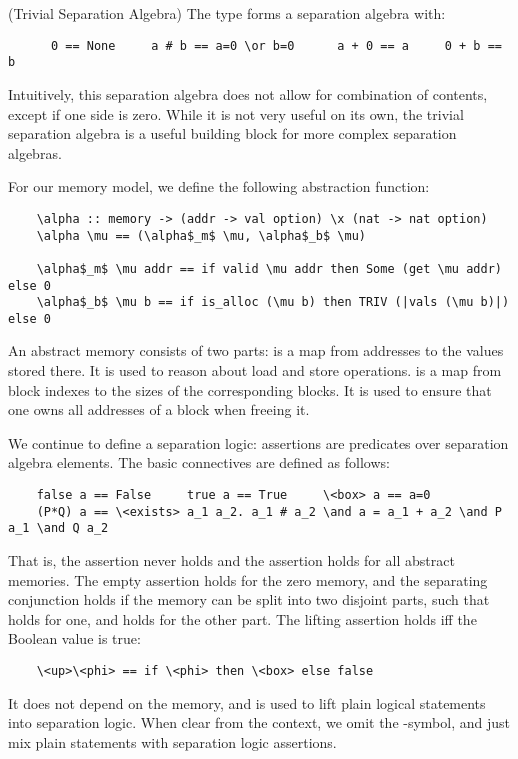 \documentclass[a4paper,UKenglish,cleveref, autoref, thm-restate]{lipics-v2021}
\begin{document}
  \begin{example}(Trivial Separation Algebra)
    The type  forms a separation algebra with:
    \begin{lstlisting}
      0 == None     a # b == a=0 \or b=0      a + 0 == a     0 + b == b
    \end{lstlisting}
    Intuitively, this separation algebra does not allow for combination of contents, except if one side is zero.
    While it is not very useful on its own, the trivial separation algebra is a useful building block for
    more complex separation algebras.
  \end{example}

  For our memory model, we define the following abstraction function:
  \begin{lstlisting}
    \alpha :: memory -> (addr -> val option) \x (nat -> nat option)
    \alpha \mu == (\alpha$_m$ \mu, \alpha$_b$ \mu)

    \alpha$_m$ \mu addr == if valid \mu addr then Some (get \mu addr) else 0
    \alpha$_b$ \mu b == if is_alloc (\mu b) then TRIV (|vals (\mu b)|) else 0
  \end{lstlisting}
  An abstract memory \is{\alpha \mu} consists of two parts:
   is a map from addresses to the values stored there. It is used to reason about load and store operations.
   is a map from block indexes to the sizes of the corresponding blocks.
    It is used to ensure that one owns all addresses of a block when freeing it.

  We continue to define a separation logic: assertions are predicates over separation algebra elements.
  The basic connectives are defined as follows:
  \begin{lstlisting}
    false a == False     true a == True     \<box> a == a=0
    (P*Q) a == \<exists> a_1 a_2. a_1 # a_2 \and a = a_1 + a_2 \and P a_1 \and Q a_2
  \end{lstlisting}
  That is, the assertion  never holds and the assertion  holds for all abstract memories.
  The empty assertion  holds for the zero memory, and the separating conjunction 
  holds if the memory can be split into two disjoint parts, such that  holds for one,
  and  holds for the other part. The lifting assertion  holds iff the Boolean value  is true:
  \begin{lstlisting}
    \<up>\<phi> == if \<phi> then \<box> else false
  \end{lstlisting}
  It does not depend on the memory, and is used to lift plain logical statements into separation logic.
  When clear from the context, we omit the -symbol, and just mix plain statements with separation logic assertions.
\end{document}
